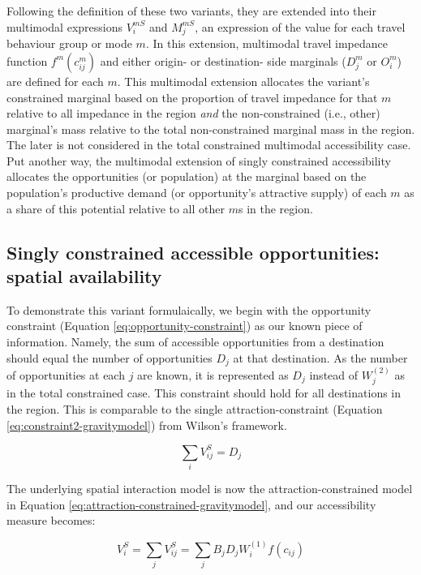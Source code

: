 \documentclass[
11pt, %
oneside, %
english, %
singlespacing, %
]{macthesis} %
\begin{document}
Following the definition of these two variants, they are extended into their multimodal expressions \(V_{i}^{mS}\) and \(M_{j}^{mS}\), an expression of the value for each travel behaviour group or mode \(m\). In this extension, multimodal travel impedance function \(f^m(c^m_{ij})\) and either origin- or destination- side marginals (\(D_j^m\) or \(O_i^m\)) are defined for each \(m\). This multimodal extension allocates the variant's constrained marginal based on the proportion of travel impedance for that \(m\) relative to all impedance in the region \emph{and} the non-constrained (i.e., other) marginal's mass relative to the total non-constrained marginal mass in the region. The later is not considered in the total constrained multimodal accessibility case. Put another way, the multimodal extension of singly constrained accessibility allocates the opportunities (or population) at the marginal based on the population's productive demand (or opportunity's attractive supply) of each \(m\) as a share of this potential relative to all other \(m\)s in the region.

\subsection{Singly constrained accessible opportunities: spatial availability}\label{singly-constrained-accessible-opportunities-spatial-availability}

To demonstrate this variant formulaically, we begin with the opportunity constraint (Equation \ref{eq:opportunity-constraint}) as our known piece of information. Namely, the sum of accessible opportunities from a destination should equal the number of opportunities \(D_j\) at that destination. As the number of opportunities at each \(j\) are known, it is represented as \(D_j\) instead of \(W_j^(2)\) as in the total constrained case. This constraint should hold for all destinations in the region. This is comparable to the single attraction-constraint (Equation \ref{eq:constraint2-gravitymodel}) from Wilson's framework.

\begin{equation}
\label{eq:opportunity-constraint}
\sum_i V^S_{ij} =  D_j
\end{equation} 

The underlying spatial interaction model is now the attraction-constrained model in Equation \ref{eq:attraction-constrained-gravitymodel}, and our accessibility measure becomes:

\begin{equation}
\label{eq:opportunity-constrained-accessibility}
V^S_{i} = \sum_j V^S_{ij} = \sum_j B_j D_j W_i^{(1)} f(c_{ij})
\end{equation} 
\end{document}
